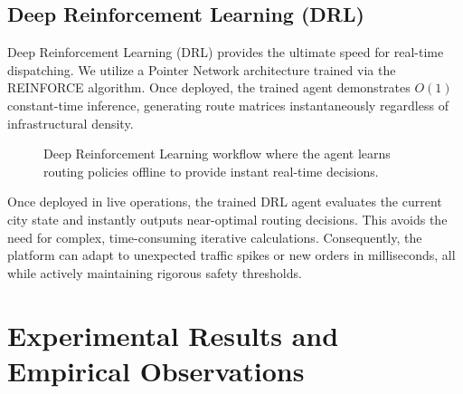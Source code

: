 \documentclass[10pt,twocolumn,letterpaper]{article}
\begin{document}
\subsection{Deep Reinforcement Learning (DRL)}

Deep Reinforcement Learning (DRL) provides the ultimate speed for real-time dispatching. We utilize a Pointer Network architecture trained via the REINFORCE algorithm. Once deployed, the trained agent demonstrates $O(1)$ constant-time inference, generating route matrices instantaneously regardless of infrastructural density.

\begin{figure}[ht]
\centering
{}
\caption{Deep Reinforcement Learning workflow where the agent learns routing policies offline to provide instant real-time decisions.}
\label{fig:drl}
\end{figure}

Once deployed in live operations, the trained DRL agent evaluates the current city state and instantly outputs near-optimal routing decisions. This avoids the need for complex, time-consuming iterative calculations. Consequently, the platform can adapt to unexpected traffic spikes or new orders in milliseconds, all while actively maintaining rigorous safety thresholds.

\section{Experimental Results and Empirical Observations}
\end{document}
